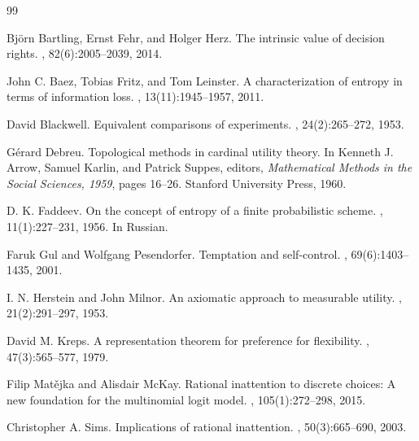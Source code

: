 \documentclass[11pt,a4paper]{article}
\theoremstyle{definition}
\newcommand{\1}{\mathbf 1}
\begin{document}
\sloppy
\begin{thebibliography}{99}
\raggedright

Bj\"orn Bartling, Ernst Fehr, and Holger Herz.
\newblock The intrinsic value of decision rights.
, 82(6):2005--2039, 2014.

John C. Baez, Tobias Fritz, and Tom Leinster.
\newblock A characterization of entropy in terms of information loss.
, 13(11):1945--1957, 2011.

David Blackwell.
\newblock Equivalent comparisons of experiments.
, 24(2):265--272, 1953.

G\'erard Debreu.
\newblock Topological methods in cardinal utility theory.
\newblock In Kenneth J. Arrow, Samuel Karlin, and Patrick Suppes, editors,
  {\em Mathematical Methods in the Social Sciences, 1959}, pages 16--26.
  Stanford University Press, 1960.

D. K. Faddeev.
\newblock On the concept of entropy of a finite probabilistic scheme.
, 11(1):227--231, 1956.
\newblock In Russian.

Faruk Gul and Wolfgang Pesendorfer.
\newblock Temptation and self-control.
, 69(6):1403--1435, 2001.

I. N. Herstein and John Milnor.
\newblock An axiomatic approach to measurable utility.
, 21(2):291--297, 1953.

David M. Kreps.
\newblock A representation theorem for preference for flexibility.
, 47(3):565--577, 1979.

Filip Mat\v{e}jka and Alisdair McKay.
\newblock Rational inattention to discrete choices: A new foundation for the multinomial logit model.
, 105(1):272--298, 2015.

Christopher A. Sims.
\newblock Implications of rational inattention.
, 50(3):665--690, 2003.

\end{thebibliography}
\end{document}
